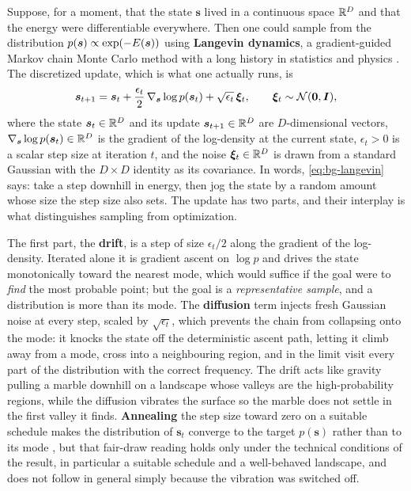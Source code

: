 Suppose, for a moment, that the state $\bm{s}$ lived in a continuous space $\mathbb{R}^D$ and that the energy were differentiable everywhere. Then one could sample from the distribution $p(\bm{s}) \propto \exp(-E(\bm{s}))$ using \textbf{Langevin dynamics}, a gradient-guided Markov chain Monte Carlo method with a long history in statistics and physics \citep{roberts1996exponential, welling2011bayesian}. The discretized update, which is what one actually runs, is
\begin{equation}
    \bm{s}_{t+1} = \bm{s}_t + \frac{\epsilon_t}{2}\,\nabla_{\bm{s}} \log p(\bm{s}_t) + \sqrt{\epsilon_t}\,\bm{\xi}_t, \qquad \bm{\xi}_t \sim \mathcal{N}(\bm{0}, \bm{I}),
    \label{eq:bg-langevin}
\end{equation}
where the state $\bm{s}_t \in \mathbb{R}^D$ and its update $\bm{s}_{t+1} \in \mathbb{R}^D$ are $D$-dimensional vectors, $\nabla_{\bm{s}}\log p(\bm{s}_t) \in \mathbb{R}^D$ is the gradient of the log-density at the current state, $\epsilon_t > 0$ is a scalar step size at iteration $t$, and the noise $\bm{\xi}_t \in \mathbb{R}^D$ is drawn from a standard Gaussian with the $D \times D$ identity as its covariance. In words, \eqref{eq:bg-langevin} says: take a step downhill in energy, then jog the state by a random amount whose size the step size also sets. The update has two parts, and their interplay is what distinguishes sampling from optimization.

The first part, the \textbf{drift}, is a step of size $\epsilon_t/2$ along the gradient of the log-density. Iterated alone it is gradient ascent on $\log p$ and drives the state monotonically toward the nearest mode, which would suffice if the goal were to \emph{find} the most probable point; but the goal is a \emph{representative sample}, and a distribution is more than its mode. The \textbf{diffusion} term injects fresh Gaussian noise at every step, scaled by $\sqrt{\epsilon_t}$, which prevents the chain from collapsing onto the mode: it knocks the state off the deterministic ascent path, letting it climb away from a mode, cross into a neighbouring region, and in the limit visit every part of the distribution with the correct frequency. The drift acts like gravity pulling a marble downhill on a landscape whose valleys are the high-probability regions, while the diffusion vibrates the surface so the marble does not settle in the first valley it finds. \textbf{Annealing} the step size toward zero on a suitable schedule makes the distribution of $\bm{s}_t$ converge to the target $p(\bm{s})$ rather than to its mode \citep{welling2011bayesian}, but that fair-draw reading holds only under the technical conditions of the result, in particular a suitable schedule and a well-behaved landscape, and does not follow in general simply because the vibration was switched off.

